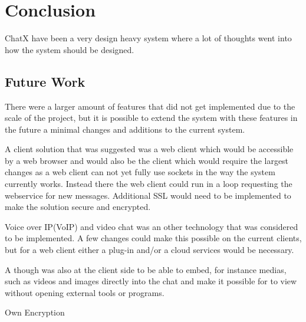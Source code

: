 \chapter{Conclusion}

ChatX have been a very design heavy system where a lot of thoughts went into how the system should be designed.

\section{Future Work}

There were a larger amount of features that did not get implemented due to the scale of the project, but it is possible to extend the system with these features in the future a minimal changes and additions to the current system.

A client solution that was suggested was a web client which would be accessible by a web browser and would also be the client which would require the largest changes as a web client can not yet fully use sockets in the way the system currently works. Instead there the web client could run in a loop requesting the webservice for new messages. Additional SSL would need to be implemented to make the solution secure and encrypted.

Voice over IP(VoIP) and video chat was an other technology that was considered to be implemented. A few changes could make this possible on the current clients, but for a web client either a plug-in and/or a cloud services would be necessary. 

A though was also at the client side to be able to embed, for instance medias, such as videos and images directly into the chat and make it possible for to view without opening external tools or programs.


Own Encryption